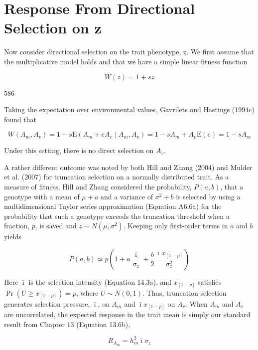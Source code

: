 \documentclass{article}
\begin{document}
\section{Response From Directional Selection on z}
Now consider directional selection on the trait phenotype, z. We first assume that the multiplicative model holds and that we have a simple linear fitness function

\begin{equation}
W(z)=1+sz
\tag{17.9a}
\label{eq:17_9a}
\end{equation}

586

Taking the expectation over environmental values, Gavrilets and Hastings (1994c) found that

\begin{equation}
W(A_{m},A_{v})=1-s\mathrm{E}(A_{m}+eA_{v}\mid A_{m},A_{v})=1-sA_{m}+A_{v}\mathrm{E}(e)=1-sA_{m}
\tag{17.9b}
\label{eq:17_9b}
\end{equation}

Under this setting, there is no direct selection on  $ A_{v} $.

A rather different outcome was noted by both Hill and Zhang (2004) and Mulder et al. (2007) for truncation selection on a normally distributed trait. As a measure of fitness, Hill and Zhang considered the probability,  $ P(a, b) $, that a genotype with a mean of  $ \mu + a $ and a variance of  $ \sigma^2 + b $ is selected by using a multidimensional Taylor series approximation (Equation A6.6a) for the probability that such a genotype exceeds the truncation threshold when a fraction,  $ p $, is saved and  $ z \sim N(\mu, \sigma^2) $. Keeping only first-order terms in  $ a $ and  $ b $ yields

\begin{equation}
P(a,b)\simeq p\left(1+a\frac{\overline{\imath}}{\sigma_{z}}+\frac{b}{2}\frac{\overline{\imath}x_{[1-p]}}{\sigma_{z}^{2}}\right)
\tag{17.10a}
\label{eq:17_10a}
\end{equation}

Here $\bar{\imath}$ is the selection intensity (Equation 14.3a), and $x_{[1-p]}$ satisfies $\Pr(U \geq x_{[1-p]}) = p$, where $U \sim N(0,1)$. Thus, truncation selection generates selection pressure, $\bar{\imath}$, on $A_m$ and $\bar{\imath} x_{[1-p]}$ on $A_v$. When $A_m$ and $A_v$ are uncorrelated, the expected response in the trait mean is simply our standard result from Chapter 13 (Equation 13.6b),

\begin{equation}
R_{A_{m}}=h_{m}^{2}\bar{\imath}\sigma_{z}
\tag{17.10b}
\label{eq:17_10b}
\end{equation}
\end{document}

